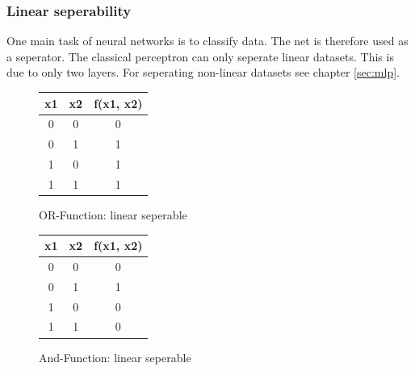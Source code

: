 \documentclass[10pt,a4paper,DIV=11]{scrreprt}
\begin{document}
\subsubsection*{Linear seperability}
One main task of neural networks is to classify data. The net is therefore used as a seperator.
The classical perceptron can only seperate linear datasets. This is due to only two layers. For seperating non-linear datasets see chapter \ref{sec:mlp}.


\begin{figure}[H]
	\centering
	\begin{tabular}{|c|c|c|}
		\hline
		x1 & x2 & f(x1, x2)\\
		\hline
		0 & 0 & 0 \\
		\hline
		0 & 1 & 1 \\
		\hline
		1 & 0 & 1 \\
		\hline
		1 & 1 & 1 \\
		\hline
	\end{tabular}
	\caption{OR-Function: linear seperable}
	\label{fig:linsep1}
	
	
\end{figure}

\begin{figure}[H]
	\centering
	\begin{tabular}{|c|c|c|}
		\hline
		x1 & x2 & f(x1, x2)\\
		\hline
		0 & 0 & 0 \\
		\hline
		0 & 1 & 1 \\
		\hline
		1 & 0 & 0 \\
		\hline
		1 & 1 & 0 \\
		\hline
	\end{tabular}
	\caption{And-Function: linear seperable}
	\label{fig:linsep2}
	
	
\end{figure}
\end{document}
